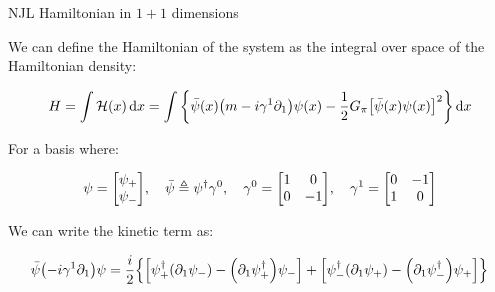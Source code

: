 \documentclass[9pt, handout, aspectratio=169]{beamer}	%
\begin{document}

\begin{frame}{NJL Hamiltonian in $1+1$ dimensions}

	We can define the Hamiltonian of the system as the integral over space of the Hamiltonian density:

	\begin{gather*}
	  H = \int \mathcal{H}(x) \dd{x}
	    = \int \qty{\bar{\psi}(x)\qty(m-i\gamma^{1}\partial_{1})\psi(x) -
	                \frac{1}{2}G_{\pi}\qty[\bar{\psi}(x)\psi(x)]^{2}} \dd{x}
	\end{gather*}

	For a basis where:

	\begin{gather*}
		\psi = \mqty[\psi_{+} \\ \psi_{-}] \qc
	  \bar{\psi} \defeq \psi^{\dagger}\gamma^{0} \qc
		\gamma^{0} = \mqty[1 & 0\\ 0 & -1] \qc
	  \gamma^{1} = \mqty[0 & -1\\ 1 & 0]
	\end{gather*}

	We can write the kinetic term as:

	\begin{gather*}
	  \bar{\psi}\qty(-i\gamma^{1}\partial_{1})\psi =
			\frac{i}{2} \qty{
	      \qty[ \psi^{\dagger}_{+} \qty(\partial_{1}\psi_{-}) -
	      \qty(\partial_{1}\psi^{\dagger}_{+}) \psi_{-} ] +
	      \qty[ \psi^{\dagger}_{-} \qty(\partial_{1}\psi_{+}) -
	      \qty(\partial_{1}\psi^{\dagger}_{-}) \psi_{+} ]
	    }
	\end{gather*}

\end{frame}

\end{document}
